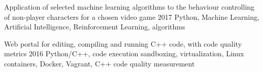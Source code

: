 


\begin{cvcourses}

  \cvcourse
    {Application of selected machine learning algorithms to the behaviour controlling of non-player characters for a chosen video game}
    {2017}
    {Python, Machine Learning, Artificial Intelligence, Reinforcement Learning, algorithms}

  \cvcourse
    {Web portal for editing, compiling and running C++ code, with code quality metrics}
    {2016}
    {Python/C++, code execution sandboxing, virtualization, Linux containers, Docker, Vagrant, C++ code quality measurement}

\end{cvcourses}
